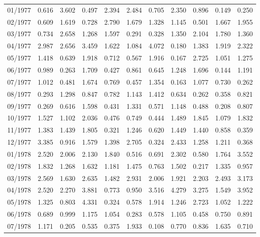 \begin{tabular}{lrrrrrrrrrr}
01/1977 &  0.616 &  3.602 &  0.497 &  2.394 &  2.484 &  0.705 &  2.350 &  0.896 &  0.149 &  0.250 \\
02/1977 &  0.609 &  1.619 &  0.728 &  2.790 &  1.679 &  1.328 &  1.145 &  0.501 &  1.667 &  1.955 \\
03/1977 &  0.734 &  2.658 &  1.268 &  1.597 &  0.291 &  0.328 &  1.350 &  2.104 &  1.780 &  1.360 \\
04/1977 &  2.987 &  2.656 &  3.459 &  1.622 &  1.084 &  4.072 &  0.180 &  1.383 &  1.919 &  2.322 \\
05/1977 &  1.418 &  0.639 &  1.918 &  0.712 &  0.567 &  1.916 &  0.167 &  2.725 &  1.051 &  1.275 \\
06/1977 &  0.989 &  0.263 &  1.709 &  0.427 &  0.861 &  0.645 &  1.248 &  1.696 &  0.144 &  1.191 \\
07/1977 &  1.012 &  0.481 &  1.674 &  0.769 &  0.457 &  1.354 &  0.163 &  1.077 &  0.730 &  0.262 \\
08/1977 &  0.293 &  1.298 &  0.847 &  0.782 &  1.143 &  1.412 &  0.634 &  0.262 &  0.358 &  0.821 \\
09/1977 &  0.269 &  0.616 &  1.598 &  0.431 &  1.331 &  0.571 &  1.148 &  0.488 &  0.208 &  0.807 \\
10/1977 &  1.527 &  1.102 &  2.036 &  0.476 &  0.749 &  0.444 &  1.489 &  1.845 &  1.079 &  1.832 \\
11/1977 &  1.383 &  1.439 &  1.805 &  0.321 &  1.246 &  0.620 &  1.449 &  1.440 &  0.858 &  0.359 \\
12/1977 &  3.385 &  0.916 &  1.579 &  1.398 &  2.705 &  0.324 &  2.433 &  1.258 &  1.211 &  0.368 \\
01/1978 &  2.520 &  2.006 &  2.130 &  1.840 &  0.516 &  0.691 &  2.302 &  0.580 &  1.764 &  3.552 \\
02/1978 &  1.832 &  1.268 &  1.632 &  1.181 &  1.475 &  0.763 &  1.502 &  0.217 &  1.335 &  0.957 \\
03/1978 &  2.569 &  1.630 &  2.635 &  1.482 &  2.931 &  2.006 &  1.921 &  2.203 &  2.493 &  3.173 \\
04/1978 &  2.520 &  2.270 &  3.881 &  0.773 &  0.950 &  3.516 &  4.279 &  3.275 &  1.549 &  3.952 \\
05/1978 &  1.325 &  0.803 &  4.331 &  0.324 &  0.578 &  1.914 &  1.246 &  2.723 &  1.052 &  1.222 \\
06/1978 &  0.689 &  0.999 &  1.175 &  1.054 &  0.283 &  0.578 &  1.105 &  0.458 &  0.750 &  0.891 \\
07/1978 &  1.171 &  0.205 &  0.535 &  0.375 &  1.933 &  0.108 &  0.770 &  0.836 &  1.635 &  0.710 \\

\end{tabular}
